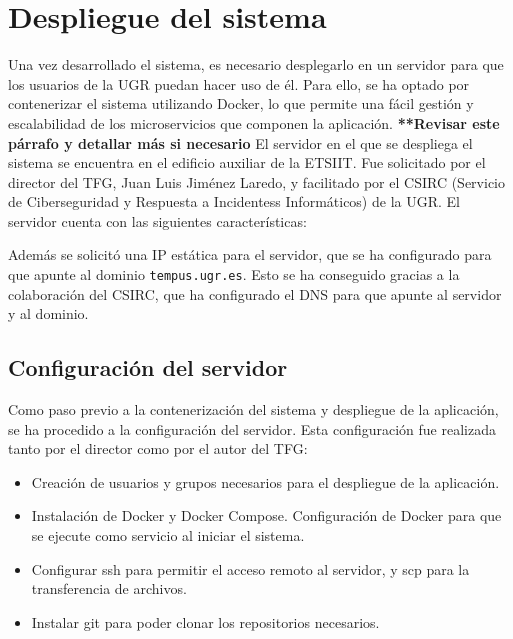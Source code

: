 \chapter{Despliegue del sistema}\label{cap:despliegue}
Una vez desarrollado el sistema, es necesario desplegarlo en un servidor para que los usuarios de la UGR puedan hacer uso de él. Para ello, se ha optado por contenerizar el sistema utilizando Docker, lo que permite una fácil gestión y escalabilidad de los microservicios que componen la aplicación.
\newline\newline
\textbf{**Revisar este párrafo y detallar más si necesario}
El servidor en el que se despliega el sistema se encuentra en el edificio auxiliar de la ETSIIT. Fue solicitado por el director del TFG, Juan Luis Jiménez Laredo, y facilitado por el CSIRC (Servicio de Ciberseguridad y Respuesta a Incidentess Informáticos) de la UGR. El servidor cuenta con las siguientes características:

Además se solicitó una IP estática para el servidor, que se ha configurado para que apunte al dominio \texttt{tempus.ugr.es}. 
Esto se ha conseguido gracias a la colaboración del CSIRC, que ha configurado el DNS para que apunte al servidor y al dominio.

\section{Configuración del servidor}
Como paso previo a la contenerización del sistema y despliegue de la aplicación, se ha procedido a la configuración del servidor. 
\newline\newline
Esta configuración fue realizada tanto por el director como por el autor del TFG:
\begin{itemize}
    \item Creación de usuarios y grupos necesarios para el despliegue de la aplicación.
    \item Instalación de Docker y Docker Compose. Configuración de Docker para que se ejecute como servicio al iniciar el sistema.
    \item Configurar ssh para permitir el acceso remoto al servidor, y scp para la transferencia de archivos.
    \item Instalar git para poder clonar los repositorios necesarios.
\end{itemize}

